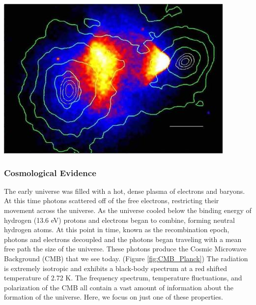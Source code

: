 \documentclass[a4paper,12pt]{article}
\begin{document}
\begin{center} \label{bulletcluster}
\includegraphics[scale=1]{bulletcluster.jpg}
\end{center}
 

\subsubsection{Cosmological Evidence}

The early universe was filled with a hot, dense plasma of electrons and baryons.  At this time photons scattered off of the free electrons, restricting their movement across the universe.  As the universe cooled below the binding energy of hydrogen (13.6 eV) protons and electrons began to combine, forming neutral hydrogen atoms.  At this point in time, known as the recombination epoch,  photons and electrons decoupled and the photons began traveling with a mean free path the size of the universe.  These photons produce the Cosmic Microwave Background (CMB) that we see today. (Figure \ref{fig:CMB_Planck})  The radiation is extremely isotropic and exhibits a black-body spectrum at a red shifted temperature of 2.72 K.  The frequency spectrum, temperature fluctuations, and polarization of the CMB all contain a vast amount of information about the formation of the universe.  Here, we focus on just one of these properties. 
\end{document}
